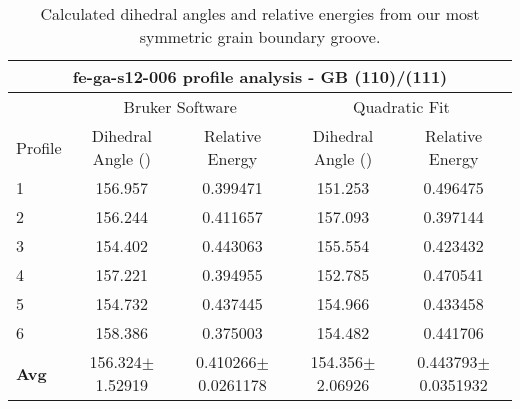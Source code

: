 \begin{table}[h!]
	\centering
	\caption{Calculated dihedral angles and relative energies from our most symmetric grain boundary groove.}
	\begin{tabular} { |p{1cm}||c|c|c|c|  } 
		\hline
		\multicolumn{5}{|c|}{fe-ga-s12-006 profile analysis - GB (110)/(111)}\\
		\hline
		~	&\multicolumn{2}{|c|}{Bruker Software}		&\multicolumn{2}{|c|}{Quadratic Fit}	\\
		\hline
		Profile	&Dihedral Angle (\degree)	&Relative Energy	&Dihedral Angle (\degree)	&Relative Energy \\ 
		\hline
		1		&156.957	&0.399471	&151.253	&0.496475	\\
		\hline
		2		&156.244	&0.411657	&157.093	&0.397144	\\
		\hline
		3		&154.402	&0.443063	&155.554	&0.423432	\\
		\hline
		4		&157.221	&0.394955	&152.785	&0.470541	\\
		\hline
		5		&154.732	&0.437445	&154.966	&0.433458	\\
		\hline
		6		&158.386	&0.375003	&154.482	&0.441706	\\
		\hline
		\textbf{Avg}	&156.324$\pm$1.52919	&0.410266$\pm$0.0261178	&154.356$\pm$2.06926	&0.443793$\pm$0.0351932\\
		\hline
	\end{tabular}
	\label{groove-analysis}
\end{table}

	



